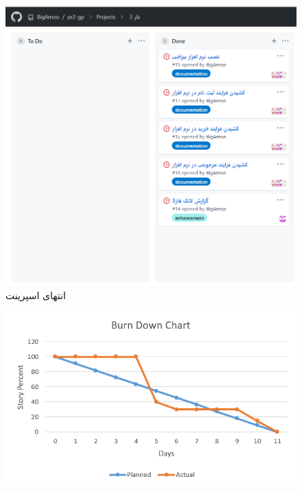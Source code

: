 \documentclass[12pt,a4paper]{article}
\begin{document}
		\begin{figure}[h!]
			\begin{center}
				\includegraphics[width=14cm]{images/screenshot_1.png}
			\end{center}
			\caption{انتهای اسپرینت}
		\end{figure}
		
		
		\begin{figure}[h!]
			\begin{center}
				\includegraphics[width=14cm]{images/Burn Down Chart 3.png}
			\end{center}
			\caption{}
		\end{figure}
\end{document}
